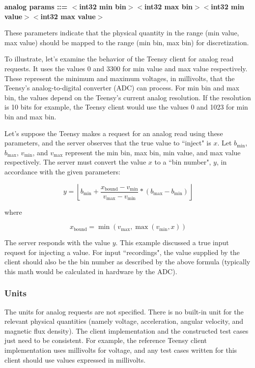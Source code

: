 \documentclass[12pt]{article}
\begin{document}
\footnotesize
\textbf{analog params ::= $<$int32 min bin$>$$<$int32 max bin$>$$<$int32 min value$>$$<$int32 max value$>$}
\normalsize

\noindent These parameters indicate that the physical quantity in the range (min value, max value) should be mapped to the range (min bin, max bin) for discretization.

To illustrate, let's examine the behavior of the Teensy client for analog read requests.  It uses the values 0 and 3300 for min value and max value respectively.  These represent the minimum and maximum voltages, in millivolts, that the Teensy's analog-to-digital converter (ADC) can process.  For min bin and max bin, the values depend on the Teensy's current analog resolution.  If the resolution is 10 bits for example, the Teensy client would use the values 0 and 1023 for min bin and max bin.

Let's suppose the Teensy makes a request for an analog read using these parameters, and the server observes that the true value to ``inject" is $x$.  Let $b_{\text{min}}$, $b_{\text{max}}$, $v_{\text{min}}$, and $v_{\text{max}}$ represent the min bin, max bin, min value, and max value respectively.  The server must convert the value $x$ to a ``bin number", $y$, in accordance with the given parameters:

$$y = \left \lfloor b_{\text{min}} + \frac{x_{\text{bound}}-v_{\text{min}}}{v_{\text{max}}-v_{\text{min}}} * (b_{\text{max}}-b_{\text{min}}) \right \rfloor$$

where

$$x_{\text{bound}} = \min(v_{\text{max}}, \max(v_{\text{min}}, x))$$

The server responds with the value $y$.  This example discussed a true input request for injecting a value.  For input ``recordings", the value supplied by the client should also be the bin number as described by the above formula (typically this math would be calculated in hardware by the ADC).

\subsubsection{Units}
The units for analog requests are not specified.  There is no built-in unit for the relevant physical quantities (namely voltage, acceleration, angular velocity, and magnetic flux density).  The client implementation and the constructed test cases just need to be consistent.  For example, the reference Teensy client implementation uses millivolts for voltage, and any test cases written for this client should use values expressed in millivolts.
\end{document}
